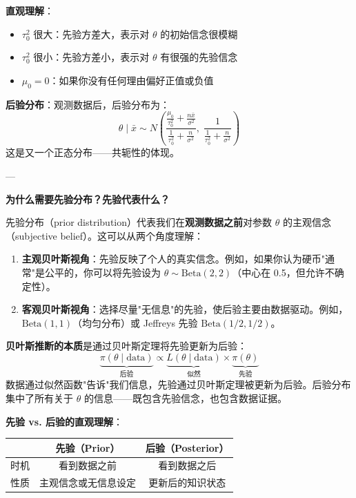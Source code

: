 \textbf{直观理解}：
\begin{itemize}
\item $\tau_0^2$ 很大：先验方差大，表示对 $\theta$ 的初始信念很模糊
\item $\tau_0^2$ 很小：先验方差小，表示对 $\theta$ 有很强的先验信念
\item $\mu_0 = 0$：如果你没有任何理由偏好正值或负值
\end{itemize}

\textbf{后验分布}：观测数据后，后验分布为：
\[
\theta \mid \bar{x} \sim N\!\left(\frac{\frac{\mu_0}{\tau_0^2} + \frac{n\bar{x}}{\sigma^2}}{\frac{1}{\tau_0^2} + \frac{n}{\sigma^2}},\; \frac{1}{\frac{1}{\tau_0^2} + \frac{n}{\sigma^2}}\right)
\]
这是又一个正态分布——共轭性的体现。

---

\textbf{为什么需要先验分布？先验代表什么？}

先验分布（prior distribution）代表我们在\textbf{观测数据之前}对参数 $\theta$ 的主观信念（subjective belief）。这可以从两个角度理解：

\begin{enumerate}
\item \textbf{主观贝叶斯视角}：先验反映了个人的真实信念。例如，如果你认为硬币"通常"是公平的，你可以将先验设为 $\theta \sim \text{Beta}(2,2)$（中心在 0.5，但允许不确定性）。

\item \textbf{客观贝叶斯视角}：选择尽量"无信息"的先验，使后验主要由数据驱动。例如，$\text{Beta}(1,1)$（均匀分布）或 Jeffreys 先验 $\text{Beta}(1/2, 1/2)$。
\end{enumerate}

\textbf{贝叶斯推断的本质}是通过贝叶斯定理将先验更新为后验：
\[
\underbrace{\pi(\theta \mid \text{data})}_{\text{后验}} \propto \underbrace{L(\theta \mid \text{data})}_{\text{似然}} \times \underbrace{\pi(\theta)}_{\text{先验}}
\]
数据通过似然函数"告诉"我们信息，先验通过贝叶斯定理被更新为后验。后验分布集中了所有关于 $\theta$ 的信息——既包含先验信念，也包含数据证据。

\textbf{先验 vs. 后验的直观理解}：
\begin{center}
\begin{tabular}{ccc}
\hline
 & \textbf{先验（Prior）} & \textbf{后验（Posterior）} \\
\hline
时机 & 看到数据之前 & 看到数据之后 \\
性质 & 主观信念或无信息设定 & 更新后的知识状态 \\
\hline
\end{tabular}
\end{center}

